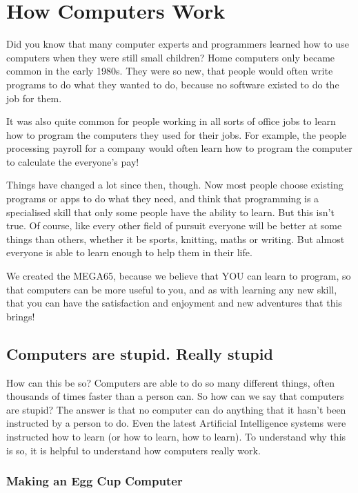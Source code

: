 \chapter{How Computers Work}

Did you know that many computer experts and programmers learned how to
use computers when they were still small children?
Home computers only became common in the early 1980s. They were so new,
that people would often write programs to do
what they wanted to do, because no software existed to do the job for them.

It was also quite common for people working in all
sorts of office jobs to learn how to program the computers they used for
their jobs.  For example, the people processing payroll
for a company would often learn how to program the computer to calculate
the everyone's pay!

Things have changed a lot since then, though.
Now most people choose existing programs or apps to do what they need,
and think that programming is a specialised skill that only some people
have the ability to learn.
But this isn't true.  Of course, like every other field of pursuit
everyone will be better at some things than others,
whether it be sports, knitting, maths or writing. But almost
everyone is able to learn enough to help them in their life.

We created the MEGA65, because we believe that YOU can learn to
program, so that computers can be more useful to you, and as with
learning any new skill, that you can have the satisfaction and enjoyment
and new adventures that this brings!


\section{Computers are stupid. Really stupid}

How can this be so? Computers are able to do so many different things, often thousands of times faster than a person can.
So how can we say that computers are stupid?  The answer is that no computer can do anything that it hasn't been instructed
by a person to do.  Even the latest Artificial Intelligence systems were instructed how to learn (or how to learn, how to learn).
To understand why this is so, it is helpful to understand how computers really work.

\subsection{Making an Egg Cup Computer}

